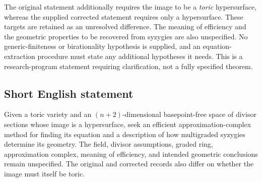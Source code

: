 \documentclass[11pt]{article}
\begin{document}
The original statement additionally requires the image to be a \emph{toric} hypersurface, whereas the supplied corrected statement requires only a hypersurface. These targets are retained as an unresolved difference. The meaning of efficiency and the geometric properties to be recovered from syzygies are also unspecified. No generic-finiteness or birationality hypothesis is supplied, and an equation-extraction procedure must state any additional hypotheses it needs. This is a research-program statement requiring clarification, not a fully specified theorem.
\subsection{Short English statement}
Given a toric variety and an \((n+2)\)-dimensional basepoint-free space of divisor sections whose image is a hypersurface, seek an efficient approximation-complex method for finding its equation and a description of how multigraded syzygies determine its geometry. The field, divisor assumptions, graded ring, approximation complex, meaning of efficiency, and intended geometric conclusions remain unspecified. The original and corrected records also differ on whether the image must itself be toric.
\end{document}
